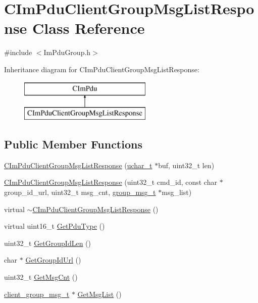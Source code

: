 \hypertarget{class_c_im_pdu_client_group_msg_list_response}{}\section{C\+Im\+Pdu\+Client\+Group\+Msg\+List\+Response Class Reference}
\label{class_c_im_pdu_client_group_msg_list_response}


{\ttfamily \#include $<$Im\+Pdu\+Group.\+h$>$}

Inheritance diagram for C\+Im\+Pdu\+Client\+Group\+Msg\+List\+Response\+:\begin{figure}[H]
\begin{center}
\leavevmode
\includegraphics[height=2.000000cm]{class_c_im_pdu_client_group_msg_list_response}
\end{center}
\end{figure}
\subsection*{Public Member Functions}
\begin{DoxyCompactItemize}
\item 
\hyperlink{class_c_im_pdu_client_group_msg_list_response_a54a4f1c0a911e24cd79b9da2cf004dfc}{C\+Im\+Pdu\+Client\+Group\+Msg\+List\+Response} (\hyperlink{base_2ostype_8h_a124ea0f8f4a23a0a286b5582137f0b8d}{uchar\+\_\+t} $\ast$buf, uint32\+\_\+t len)
\item 
\hyperlink{class_c_im_pdu_client_group_msg_list_response_ab124233f73b91db5e37c5af67ebff439}{C\+Im\+Pdu\+Client\+Group\+Msg\+List\+Response} (uint32\+\_\+t cmd\+\_\+id, const char $\ast$group\+\_\+id\+\_\+url, uint32\+\_\+t msg\+\_\+cnt, \hyperlink{structgroup__msg__t}{group\+\_\+msg\+\_\+t} $\ast$msg\+\_\+list)
\item 
virtual \hyperlink{class_c_im_pdu_client_group_msg_list_response_a64330ffe37fd61e577cba7cf07e52e3f}{$\sim$\+C\+Im\+Pdu\+Client\+Group\+Msg\+List\+Response} ()
\item 
virtual uint16\+\_\+t \hyperlink{class_c_im_pdu_client_group_msg_list_response_abeb82c6ee47328458b805fae61a29ef9}{Get\+Pdu\+Type} ()
\item 
uint32\+\_\+t \hyperlink{class_c_im_pdu_client_group_msg_list_response_afc78bcc9da8405568d28acf5a5ceb9ed}{Get\+Group\+Id\+Len} ()
\item 
char $\ast$ \hyperlink{class_c_im_pdu_client_group_msg_list_response_ac68179d8f3d5f1e6bb9fea26cadda902}{Get\+Group\+Id\+Url} ()
\item 
uint32\+\_\+t \hyperlink{class_c_im_pdu_client_group_msg_list_response_a025eb61f353c0515450818d0f36828a1}{Get\+Msg\+Cnt} ()
\item 
\hyperlink{structclient__group__msg__t}{client\+\_\+group\+\_\+msg\+\_\+t} $\ast$ \hyperlink{class_c_im_pdu_client_group_msg_list_response_a18e34479636c45ec47bd1eb36a6dd8c1}{Get\+Msg\+List} ()
\end{DoxyCompactItemize}
